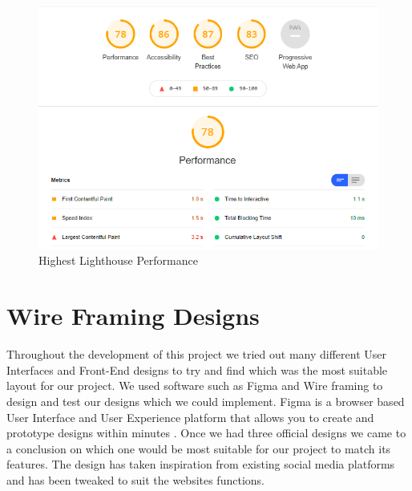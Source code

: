 \begin{figure}[H]
  \centering
  \includegraphics[scale=0.6]{img/best_lighthouse.jpg}
  \caption{Highest Lighthouse Performance}
  \label{fig:highest_lighthouse}
\end{figure}

\newline

\section{Wire Framing Designs}

Throughout the development of this project we tried out many different User Interfaces and Front-End designs to try and find which was the most suitable layout for our project. We used software such as Figma and Wire framing to design and test our designs which we could implement. Figma is a browser based User Interface and User Experience platform that allows you to create and prototype designs within minutes \cite{figma}. Once we had three official designs we came to a conclusion on which one would be most suitable for our project to match its features. The design has taken inspiration from existing social media platforms and has been tweaked to suit the websites functions. 

